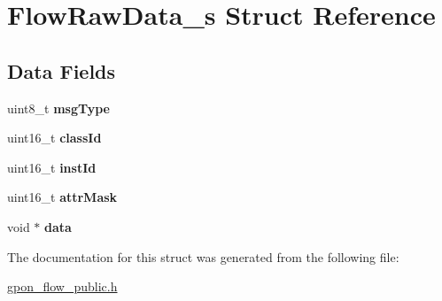 \hypertarget{structFlowRawData__s}{}\section{Flow\+Raw\+Data\+\_\+s Struct Reference}
\label{structFlowRawData__s}
\subsection*{Data Fields}
\begin{DoxyCompactItemize}
\item 
\mbox{\label{structFlowRawData__s_a955ff3fb71b2d9e7913b7d0d367c5cbb}} 
uint8\+\_\+t {\bfseries msg\+Type}
\item 
\mbox{\label{structFlowRawData__s_af757397fe164eb2724877160652dd359}} 
uint16\+\_\+t {\bfseries class\+Id}
\item 
\mbox{\label{structFlowRawData__s_ad01c329fcaa01b6cddbd27bfbed7b06a}} 
uint16\+\_\+t {\bfseries inst\+Id}
\item 
\mbox{\label{structFlowRawData__s_a6fcf27202f872c8da6c86e4c8250eea4}} 
uint16\+\_\+t {\bfseries attr\+Mask}
\item 
\mbox{\label{structFlowRawData__s_ad1f6f73813858fd34b3eec0e48140e93}} 
void $\ast$ {\bfseries data}
\end{DoxyCompactItemize}


The documentation for this struct was generated from the following file\+:\begin{DoxyCompactItemize}
\item 
\hyperlink{gpon__flow__public_8h}{gpon\+\_\+flow\+\_\+public.\+h}\end{DoxyCompactItemize}
